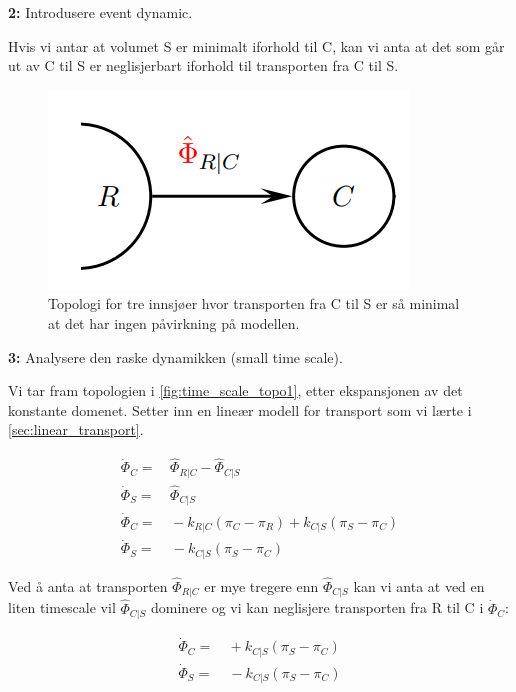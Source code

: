 \begin{center}
    \textbf{2:} Introdusere event dynamic.
\end{center}

Hvis vi antar at volumet S er minimalt iforhold til C, kan vi anta at det som går ut av C til S er neglisjerbart iforhold til transporten fra C til S.

\begin{figure}[H]
    \centering
    \includegraphics[scale=0.5]{Figures/time_scale_topo2.png}
    \caption{Topologi for tre innsjøer hvor transporten fra C til S er så minimal at det har ingen påvirkning på modellen.}
    \label{fig:time_scale_topo2}
\end{figure}



\begin{center}
    \textbf{3:} Analysere den raske dynamikken (small time scale).
\end{center}

Vi tar fram topologien i \cref{fig:time_scale_topo1}, etter ekspansjonen av det konstante domenet. Setter inn en lineær modell for transport som vi lærte i \cref{sec:linear_transport}.

\begin{align}
    \dot{\Phi}_C =&\, \hat{\Phi}_{R|C} - \hat{\Phi}_{C|S}\\
    \dot{\Phi}_S =&\, \hat{\Phi}_{C|S} \\[0.5cm]
    \dot{\Phi}_C =&\, -k_{R|C}(\pi_C-\pi_R) +k_{C|S}(\pi_S-\pi_C)\\
      \dot{\Phi}_S =&\ -k_{C|S}(\pi_S-\pi_C)
\end{align}

Ved å anta at transporten $\hat{\Phi}_{R|C}$ er mye tregere enn  $\hat{\Phi}_{C|S}$ kan vi anta at ved en liten timescale vil $\hat{\Phi}_{C|S}$ dominere og vi kan neglisjere transporten fra R til C i $\dot{\Phi}_C$:

\begin{align}
    \dot{\Phi}_C =&\, +k_{C|S}(\pi_S-\pi_C)\\
      \dot{\Phi}_S =&\ -k_{C|S}(\pi_S-\pi_C)
\end{align}

